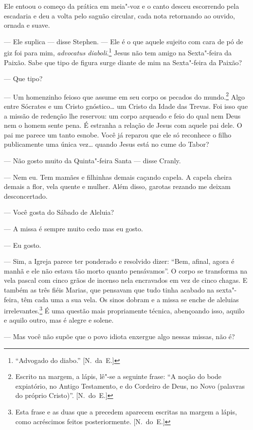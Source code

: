 Ele entoou o começo da prática em meia"-voz e o canto desceu escorrendo pela
escadaria e deu a volta pelo saguão circular, cada nota retornando ao ouvido,
ornada e suave.

--- Ele suplica --- disse Stephen.  --- Ele é o que aquele sujeito com cara de
pó de giz foi para mim, \textit{advocatus diaboli}.\footnote{ ``Advogado do diabo.'' [N.~da~E.]}  Jesus não tem amigo na
Sexta"-feira da Paixão.  Sabe que tipo de figura surge diante de mim na
Sexta"-feira da Paixão?

--- Que tipo?

--- Um homenzinho feioso que assume em seu corpo os pecados do mundo.\footnote{
Escrito na margem, a lápis, lê"-se a seguinte frase: “A noção do bode
expiatório, no Antigo Testamento, e do Cordeiro de Deus, no Novo (palavras do
próprio Cristo)”. [N.~do~E.]}  Algo entre Sócrates e um Cristo gnóstico\ldots{} um
Cristo da Idade das Trevas.  Foi isso que a missão de redenção lhe reservou: um
corpo arqueado e feio do qual nem Deus nem o homem sente pena.  É estranha a
relação de Jesus com aquele pai dele.  O pai me parece um tanto esnobe.  Você
já reparou que ele só reconhece o filho publicamente uma única vez\ldots{} quando
Jesus está no cume do Tabor?

--- Não gosto muito da Quinta"-feira Santa --- disse Cranly.

--- Nem eu.  Tem mamães e filhinhas demais caçando capela.  A capela cheira
demais a flor, vela quente e mulher.  Além disso, garotas rezando me deixam
desconcertado.

--- Você gosta do Sábado de Aleluia?

--- A missa é sempre muito cedo mas eu gosto.

--- Eu gosto.

--- Sim, a Igreja parece ter ponderado e resolvido dizer: “Bem, afinal, agora é
manhã e ele não estava tão morto quanto pensávamos”.  O corpo se transforma na
vela pascal com cinco grãos de incenso nela encravados em vez de cinco chagas.
E também as três fiéis Marias, que pensavam que tudo tinha acabado na
sexta"-feira, têm cada uma a sua vela.  Os sinos dobram e a missa se enche de
aleluias irrelevantes.\footnote{ Esta frase e as duas que a precedem aparecem
escritas na margem a lápis, como acréscimos feitos posteriormente. [N.~do~E.]}
É uma questão mais propriamente técnica, abençoando isso, aquilo e aquilo
outro, mas é alegre e solene.

--- Mas você não supõe que o povo idiota enxergue algo nessas missas, não é?

